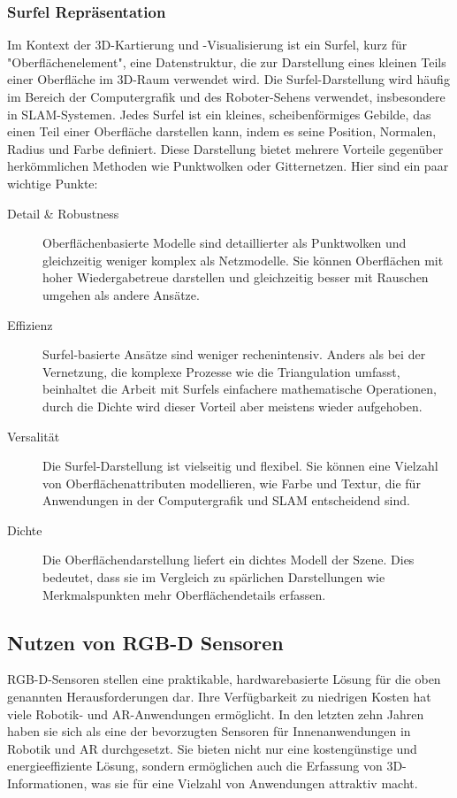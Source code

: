 \subsubsection{Surfel Repräsentation}

Im Kontext der 3D-Kartierung und -Visualisierung ist ein Surfel, kurz für "Oberflächenelement", eine Datenstruktur, die zur Darstellung eines kleinen Teils einer Oberfläche im 3D-Raum verwendet wird. Die Surfel-Darstellung wird häufig im Bereich der Computergrafik und des Roboter-Sehens verwendet, insbesondere in \ac{SLAM}-Systemen.
Jedes Surfel ist ein kleines, scheibenförmiges Gebilde, das einen Teil einer Oberfläche darstellen kann, indem es seine Position, Normalen, Radius und Farbe definiert. Diese Darstellung bietet mehrere Vorteile gegenüber herkömmlichen Methoden wie Punktwolken oder Gitternetzen. Hier sind ein paar wichtige Punkte:

\begin{description}
    \item[Detail \& Robustness] Oberflächenbasierte Modelle sind detaillierter als Punktwolken und gleichzeitig weniger komplex als Netzmodelle. Sie können Oberflächen mit hoher Wiedergabetreue darstellen und gleichzeitig besser mit Rauschen umgehen als andere Ansätze.
    \item[Effizienz] Surfel-basierte Ansätze sind weniger rechenintensiv. Anders als bei der Vernetzung, die komplexe Prozesse wie die Triangulation umfasst, beinhaltet die Arbeit mit Surfels einfachere mathematische Operationen, durch die Dichte wird dieser Vorteil aber meistens wieder aufgehoben.
    \item[Versalität] Die Surfel-Darstellung ist vielseitig und flexibel. Sie können eine Vielzahl von Oberflächenattributen modellieren, wie Farbe und Textur, die für Anwendungen in der Computergrafik und SLAM entscheidend sind.
    \item[Dichte] Die Oberflächendarstellung liefert ein dichtes Modell der Szene. Dies bedeutet, dass sie im Vergleich zu spärlichen Darstellungen wie Merkmalspunkten mehr Oberflächendetails erfassen.   
\end{description}

\subsection{Nutzen von RGB-D Sensoren}

RGB-D-Sensoren stellen eine praktikable, hardwarebasierte Lösung für die oben genannten Herausforderungen dar. Ihre Verfügbarkeit zu niedrigen Kosten hat viele Robotik- und AR-Anwendungen ermöglicht. In den letzten zehn Jahren haben sie sich als eine der bevorzugten Sensoren für Innenanwendungen in Robotik und AR durchgesetzt. Sie bieten nicht nur eine kostengünstige und energieeffiziente Lösung, sondern ermöglichen auch die Erfassung von 3D-Informationen, was sie für eine Vielzahl von Anwendungen attraktiv macht.

